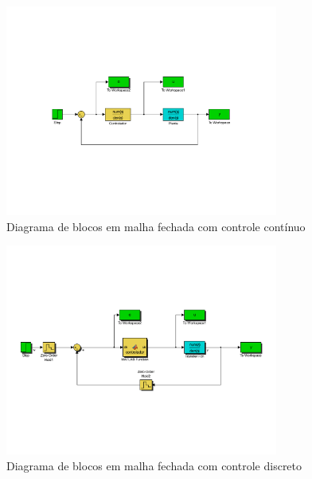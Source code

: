     \begin{figure}[H]
	\center
	\includegraphics[width=0.8\textwidth]{images/ex6simcontinuo.pdf}
	\caption{Diagrama de blocos em malha fechada com controle contínuo}
	\label{fig:ex6continuo}
    \end{figure}

    \begin{figure}[H]
	\center
	\includegraphics[width=0.8\textwidth]{images/ex6simdiscreto.pdf}
	\caption{Diagrama de blocos em malha fechada com controle discreto}
	\label{fig:ex6discreto}
    \end{figure}